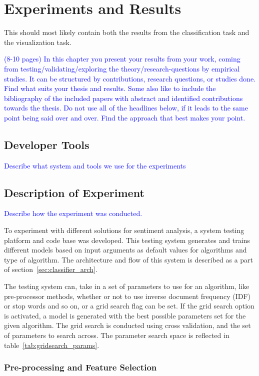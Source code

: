 \chapter{Experiments and Results}

This should most likely contain both the results from the classification task and the visualization task.

\textcolor{blue}{(8-10 pages) In this chapter you present your results from your work, coming from 
testing/validating/exploring the theory/research-questions by empirical studies. It can be structured by contributions, 
research questions, or studies done. Find what suits your thesis and results. Some also like to include the 
bibliography of the included papers with abstract and identified contributions towards the thesis. Do not use all of 
the headlines below, if it leads to the same point being said over and over. Find the approach that best makes your 
point.}

\section{Developer Tools}
\textcolor{blue}{Describe what system and tools we use for the experiments}


\section{Description of Experiment}
\textcolor{blue}{Describe how the experiment was conducted.}

To experiment with different solutions for sentiment analysis, a system testing platform and code base was developed. This testing system generates and trains different models based on input arguments as default values for algorithms and type of algorithm. The architecture and flow of this system is described as a part of section~\ref{sec:classifier_arch}.

The testing system can, take in a set of parameters to use for an algorithm, like pre-processor methods, whether or not to use inverse document frequency (IDF) or stop words and so on, or a grid search flag can be set. If the grid search option is activated, a model is generated with the best possible parameters set for the given algorithm. The grid search is conducted using cross validation, and the set of parameters to search across. The parameter search space is reflected in table~\ref{tab:gridsearch_params}.


\subsection{Pre-processing and Feature Selection}

